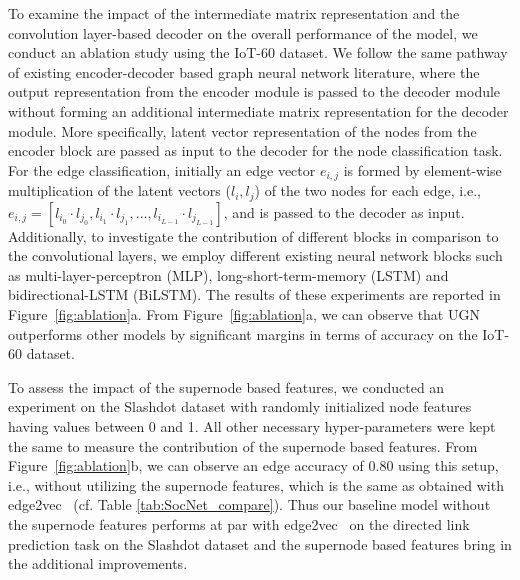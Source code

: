 % 


To examine the impact of the intermediate matrix representation and the convolution layer-based decoder on the overall performance of the model, we conduct an ablation study using the IoT-60 dataset.
We follow the same pathway of existing encoder-decoder based graph neural network literature, where the output representation from the encoder module is passed to the decoder module without forming an additional intermediate matrix representation for the decoder module. More specifically, latent vector representation of the nodes from the encoder block are passed as input to the decoder for the node classification task. For the edge classification, initially an edge vector \(e_{i,j}\) is formed by element-wise multiplication of the latent vectors (\(l_i, l_j\)) of the two nodes for each edge, i.e., 
$e_{i,j} = [l_{i_0} \cdot l_{j_0}, l_{i_1} \cdot l_{j_1}, \dots, l_{i_{L-1}} \cdot l_{j_{L-1}}]$,  
and is passed to the decoder as input. Additionally, to investigate the contribution of different blocks in comparison to the convolutional layers, we employ different existing neural network blocks such as multi-layer-perceptron (MLP), long-short-term-memory (LSTM) and bidirectional-LSTM (BiLSTM). The results of these experiments are reported in Figure~\ref{fig:ablation}a. 
From Figure~\ref{fig:ablation}a, we can observe that  UGN outperforms other models by significant margins in terms of accuracy on the IoT-60 dataset.

To assess the impact of the supernode based features, we conducted an experiment on the Slashdot dataset with randomly initialized node features having values between 0 and 1. All other necessary hyper-parameters were kept the same to measure the contribution of the supernode based features. From Figure~\ref{fig:ablation}b, 
we can observe an edge accuracy of 0.80 using this setup, i.e., without utilizing the supernode features, which is the same as obtained with edge2vec~\cite{wang2020edge2vec} (cf. Table \ref{tab:SocNet_compare}).
Thus our baseline model without the supernode features performs at par with edge2vec~\cite{wang2020edge2vec} on the directed link prediction task on the Slashdot dataset and the supernode based features bring in the additional improvements.


